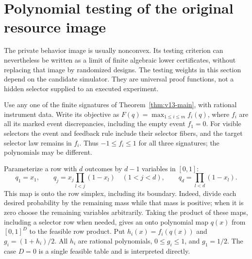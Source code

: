 \section{Polynomial testing of the original resource image}
\label{sec:v16-dual}
The private behavior image is usually nonconvex. Its testing criterion
can nevertheless be written as a limit of finite algebraic lower
certificates, without replacing that image by randomized designs.
The testing weights in this section depend on the candidate simulator.
They are universal proof functions, not a hidden selector supplied to
an executed experiment.

Use any one of the finite signatures of
Theorem~\ref{thm:v13-main}, with rational instrument data. Write its
objective as $F(q)=\max_{1\le i\le m}f_i(q)$, where $f_i$ are all its
marked event discrepancies, including the empty event $f_1=0$.
For visible selectors the event and feedback rule include their selector
fibers, and the target selector law remains in $f_i$. Thus $-1\le f_i\le1$
for all three signatures; the polynomials may be different.

Parameterize a row with $d$ outcomes by $d-1$ variables in $[0,1]$:
\[
 q_1=x_1,\qquad q_j=x_j\prod_{l<j}(1-x_l)\quad(1<j<d),
 \qquad q_d=\prod_{l<d}(1-x_l).
\]
This map is onto the row simplex, including its boundary. Indeed, divide
each desired probability by the remaining mass while that mass is
positive; when it is zero choose the remaining variables arbitrarily.
Taking the product of these maps, including a selector row when needed,
gives an onto polynomial map $q(x)$ from $[0,1]^D$ to the feasible
row product. Put $h_i(x)=f_i(q(x))$ and $g_i=(1+h_i)/2$.
All $h_i$ are rational polynomials, $0\le g_i\le1$, and $g_1=1/2$.
The case $D=0$ is a single feasible table and is interpreted directly.

